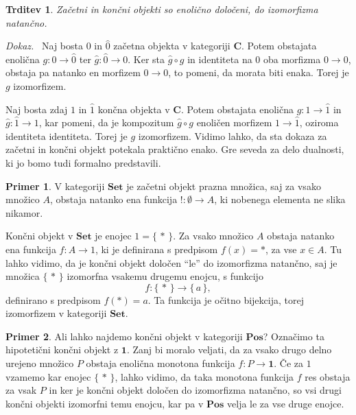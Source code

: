 \documentclass[12pt,a4paper]{book}
\theoremstyle{definition}
\theoremstyle{plain}
\newtheorem{trditev}[definicija]{Trditev}
\newenvironment{dokaz}{\emph{Dokaz.}\ }{\hspace{\fill}{$\Box$}}
\theoremstyle{definition}
\newtheorem{primer}{Primer}[section]
\theoremstyle{remark}
\newcommand{\cat}[1]{\textbf{#1}}
\renewcommand{\set}[1]{\{\,#1\,\}}
\begin{document}
\begin{trditev}
Začetni in končni objekti so enolično določeni, do izomorfizma natančno.
\end{trditev}
\begin{dokaz}
Naj bosta $0$ in $\hat{0}$ začetna objekta v kategoriji $\cat{C}$. Potem obstajata enolična $g : 0 \to \hat{0}$ ter $\hat{g} : \hat{0} \to 0$. Ker sta $\hat{g} \circ g$ in identiteta na $0$ oba morfizma $0 \to 0$, obstaja pa natanko en morfizem $0 \to 0$, to pomeni, da morata biti enaka. Torej je $g$ izomorfizem.

Naj bosta zdaj $1$ in $\hat{1}$ končna objekta v $\cat{C}$. Potem obstajata enolična $g : 1 \to \hat{1}$ in $\hat{g} : \hat{1} \to 1$, kar pomeni, da je kompozitum $\hat{g} \circ g$ enoličen morfizem $1 \to \hat{1}$, oziroma identiteta identiteta. Torej je $g$ izomorfizem.
\end{dokaz}
Vidimo lahko, da sta dokaza za začetni in končni objekt potekala praktično enako. Gre seveda za delo dualnosti, ki jo bomo tudi formalno predstavili.

\begin{primer}
V kategoriji $\cat{Set}$ je začetni objekt prazna množica, saj za vsako množico $A$, obstaja natanko ena funkcija $! : \emptyset \to A$, ki nobenega elementa ne slika nikamor. 

Končni objekt v $\cat{Set}$ je enojec $1 = \set{*}$. Za vsako množico $A$ obstaja natanko ena funkcija $f : A \to 1$, ki je definirana s predpisom $f(x) = *$, za vse $x \in A$. Tu lahko vidimo, da je končni objekt določen "`le"' do izomorfizma natančno, saj je množica $\set{*}$ izomorfna vsakemu drugemu enojcu, s funkcijo 
$$f : \set{*} \to \set{a},$$
definirano s predpisom $f(*) = a$. Ta funkcija je očitno bijekcija, torej izomorfizem v kategoriji $\cat{Set}$.
\end{primer}


\begin{primer}
Ali lahko najdemo končni objekt v kategoriji $\cat{Pos}$? Označimo ta hipotetični končni objekt z $\textbf{1}$. Zanj bi moralo veljati, da za vsako drugo delno urejeno množico $P$ obstaja enolična monotona funkcija $f : P \to \textbf{1}$. Če za $1$ vzamemo kar enojec $\set{*}$, lahko vidimo, da taka monotona funkcija $f$ res obstaja za vsak $P$ in ker je končni objekt določen do izomorfizma natančno, so vsi drugi končni objekti izomorfni temu enojcu, kar pa v $\cat{Pos}$ velja le za vse druge enojce.
\end{primer}
\end{document}
